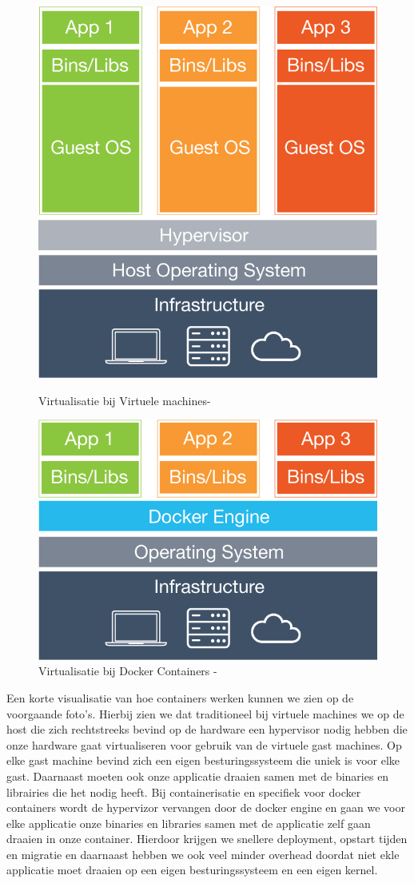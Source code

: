 \begin{figure}[!ht]
	\centering
	\begin{minipage}{.5\textwidth}
		\centering
		\includegraphics[width=.7\linewidth]{img/what-is-docker-diagram.png}
		\caption{Virtualisatie bij Virtuele machines- \protect\cite{Docker2016d}}
		\label{fig:test1}
	\end{minipage}%
	\begin{minipage}{.5\textwidth}
		\centering
		\includegraphics[width=.7\linewidth]{img/what-is-vm-diagram.png}
		\caption{Virtualisatie bij Docker Containers - \protect\cite{Docker2016d}}
		\label{fig:test2}
	\end{minipage}
\end{figure}

Een korte visualisatie van hoe containers werken kunnen we zien op de voorgaande foto's. Hierbij zien we dat traditioneel bij virtuele machines we op de host die zich rechtstreeks bevind op de hardware een hypervisor nodig hebben die onze hardware gaat virtualiseren voor gebruik van de virtuele gast machines. Op elke gast machine bevind zich een eigen besturingssysteem die uniek is voor elke gast. Daarnaast moeten ook onze applicatie draaien samen met de binaries en librairies die het nodig heeft. Bij containerisatie en specifiek voor docker containers wordt de hypervizor vervangen door de docker engine en gaan we voor elke applicatie onze binaries en libraries samen met de applicatie zelf gaan draaien in onze container. Hierdoor krijgen we snellere deployment, opstart tijden en migratie en daarnaast hebben we ook veel minder overhead doordat niet ekle applicatie moet draaien op een eigen besturingssysteem en een eigen kernel. 

